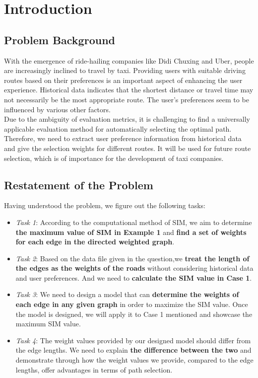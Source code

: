 \section{Introduction}

\subsection{Problem Background}%

\indent\indent  With the emergence of ride-hailing companies like Didi Chuxing and Uber, people are increasingly inclined to travel by taxi. Providing users with suitable driving routes based on their preferences is an important aspect of enhancing the user experience. Historical data indicates that the shortest distance or travel time may not necessarily be the most appropriate route. The user's preferences seem to be influenced by various other factors.\\
\indent Due to the ambiguity of evaluation metrics, it is challenging to find a universally applicable evaluation method for automatically selecting the optimal path. Therefore, we need to extract user preference information from historical data and give the selection weights for different routes. It will be used for future route selection, which is of importance for the development of taxi companies.

\subsection{Restatement of the Problem}%

\indent\indent Having understood the problem, we figure out the following tasks:
\begin{itemize}
    \item \textit{Task 1}: According to the computational method of SIM, we aim to determine \textbf{the maximum value of SIM in Example 1} and \textbf{find a set of weights for each edge in the directed weighted graph}.
    \item \textit{Task 2}: Based on the data file given in the question,we \textbf{treat the length of the edges as the weights of the roads} without considering historical data and user preferences. And we need to \textbf{calculate the SIM value in Case 1}.
    \item \textit{Task 3}: We need to design a model that can \textbf{determine the weights of each edge in any given graph} in order to maximize the SIM value. Once the model is designed, we will apply it to Case 1 mentioned and showcase the maximum SIM value.
    \item \textit{Task 4}: The weight values provided by our designed model should differ from the edge lengths. We need to explain \textbf{the difference between the two} and demonstrate through how the weight values we provide, compared to the edge lengths, offer advantages in terms of path selection.
\end{itemize}

